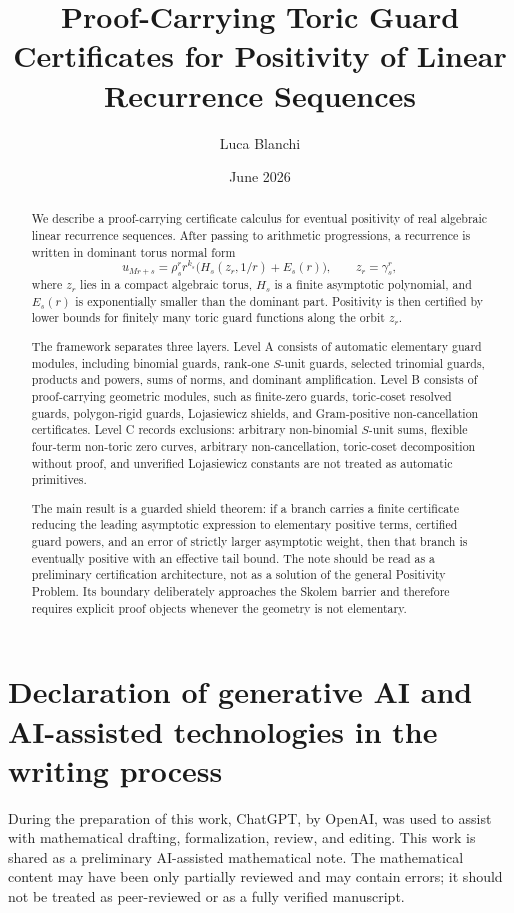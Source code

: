 \documentclass[11pt]{article}
\title{Proof-Carrying Toric Guard Certificates for Positivity of Linear Recurrence Sequences}
\author{Luca Blanchi}
\date{June 2026}
\begin{document}
\maketitle

\begin{abstract}
We describe a proof-carrying certificate calculus for eventual positivity of real algebraic linear recurrence sequences. After passing to arithmetic progressions, a recurrence is written in dominant torus normal form
\[
u_{Mr+s}
=
\rho_s^r r^{k_s}\bigl(H_s(z_r,1/r)+E_s(r)\bigr),
\qquad z_r=\gamma_s^r,
\]
where \(z_r\) lies in a compact algebraic torus, \(H_s\) is a finite asymptotic polynomial, and \(E_s(r)\) is exponentially smaller than the dominant part. Positivity is then certified by lower bounds for finitely many toric guard functions along the orbit \(z_r\).

The framework separates three layers. Level A consists of automatic elementary guard modules, including binomial guards, rank-one \(S\)-unit guards, selected trinomial guards, products and powers, sums of norms, and dominant amplification. Level B consists of proof-carrying geometric modules, such as finite-zero guards, toric-coset resolved guards, polygon-rigid guards, Lojasiewicz shields, and Gram-positive non-cancellation certificates. Level C records exclusions: arbitrary non-binomial \(S\)-unit sums, flexible four-term non-toric zero curves, arbitrary non-cancellation, toric-coset decomposition without proof, and unverified Lojasiewicz constants are not treated as automatic primitives.

The main result is a guarded shield theorem: if a branch carries a finite certificate reducing the leading asymptotic expression to elementary positive terms, certified guard powers, and an error of strictly larger asymptotic weight, then that branch is eventually positive with an effective tail bound. The note should be read as a preliminary certification architecture, not as a solution of the general Positivity Problem. Its boundary deliberately approaches the Skolem barrier and therefore requires explicit proof objects whenever the geometry is not elementary.
\end{abstract}

\section*{Declaration of generative AI and AI-assisted technologies in the writing process}
During the preparation of this work, ChatGPT, by OpenAI, was used to assist with mathematical drafting, formalization, review, and editing. This work is shared as a preliminary AI-assisted mathematical note. The mathematical content may have been only partially reviewed and may contain errors; it should not be treated as peer-reviewed or as a fully verified manuscript.
\end{document}
